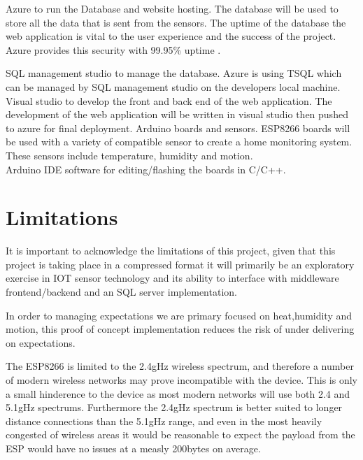 \documentclass{article}
\begin{document}
        Azure to run the Database and website hosting. The database will be used to store all the data that is 
        sent from the sensors. The uptime of the database the web application is vital to the user experience 
        and the success of the project. Azure provides this security with 99.95\% uptime \cite{AzureUptime}.
        \par
        SQL management studio to manage the database. Azure is using TSQL which can be managed by SQL management studio 
        on the developers local machine. Visual studio to develop the front and back end of the web application. 
        The development of the web application will be written in visual studio then pushed to azure for final deployment.
        Arduino boards and sensors. ESP8266 boards will be used with a variety of compatible sensor to create a home 
        monitoring system. These sensors include temperature, humidity and motion.\\
        Arduino IDE software for editing/flashing the boards in C/C++.

    \newpage

    \section{Limitations}
        It is important to acknowledge the limitations of this project, given that this project is taking place 
        in a compressed format it will primarily be an exploratory exercise in IOT sensor technology and its 
        ability to interface with middleware frontend/backend and an SQL server implementation.
        \par
        In order to managing expectations we are primary focused on heat,humidity and motion, this proof of 
        concept implementation reduces the risk of under delivering on expectations.
        \par        
        The ESP8266 is limited to the 2.4gHz wireless spectrum, and therefore a number of modern wireless
        networks may prove incompatible with the device. This is only a small hinderence to the device as
        most modern networks will use both 2.4 and 5.1gHz spectrums. Furthermore the 2.4gHz spectrum is 
        better suited to longer distance connections than the 5.1gHz range, and even in the most
        heavily congested of wireless areas it would be reasonable to expect the payload from the ESP would
        have no issues at a measly 200bytes on average.
        \newpage
\end{document}
